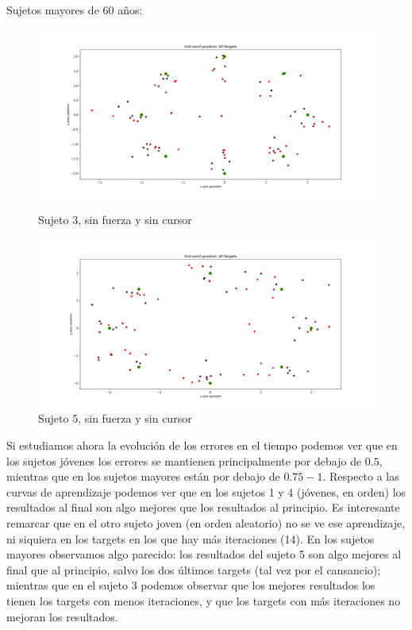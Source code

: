 \documentclass[a4paper,11pt, oneside]{book}
\begin{document}
Sujetos mayores de 60 años:
\begin{figure}[H]
	\begin{minipage}[b]{0.5\linewidth}
		\centering
		\includegraphics[width=\linewidth]{sujeto3/no_force_no_cursor/trayectorias_puntos}
		\caption{Sujeto 3, sin fuerza y sin cursor}
		\label{fig:figura1}
	\end{minipage}
	\hspace{0.5cm}
	\begin{minipage}[b]{0.5\linewidth}
		\centering
		\includegraphics[width=\linewidth]{sujeto5/no_force_no_cursor/trayectorias_puntos}
		\caption{Sujeto 5, sin fuerza y sin cursor}
		\label{fig:figura2}
	\end{minipage}
\end{figure}

Si estudiamos ahora la evolución de los errores en el tiempo podemos ver que en los sujetos jóvenes los errores se mantienen principalmente por debajo de $0.5$, mientras que en los sujetos mayores están por debajo de $0.75-1$. Respecto a las curvas de aprendizaje podemos ver que en los sujetos 1 y 4 (jóvenes, en orden) los resultados al final son algo mejores que los resultados al principio. Es interesante remarcar que en el otro sujeto joven (en orden aleatorio) no se ve ese aprendizaje, ni siquiera en los targets en los que hay más iteraciones (14). En los sujetos mayores observamos algo parecido: los resultados del sujeto 5 son algo mejores al final que al principio, salvo los dos últimos targets (tal vez por el cansancio); mientras que en el sujeto 3 podemos observar que los mejores resultados los tienen los targets con menos iteraciones, y que los targets con más iteraciones no mejoran los resultados.
\end{document}
